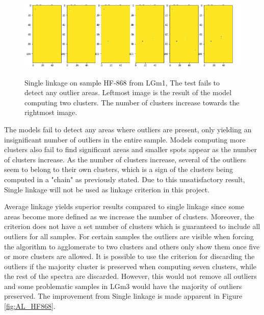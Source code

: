 \begin{figure}[H]

    \centering
{\includegraphics[width=15cm]{images/Single_linkage/LGm-1/HF-868_1_2.h5_0.png} }
\caption{Single linkage on sample HF-868 from LGm1, The test fails to detect any outlier areas. Leftmost image is the result of the model computing two clusters. The number of clusters increase towards the rightmost image.\label{fig:SL_HF868}}%

\end{figure}

The models fail to detect any areas where outliers are present, only yielding an insignificant number of outliers in the entire sample. Models computing more clusters also fail to find significant areas and smaller spots appear as the number of clusters increase. As the number of clusters increase, several of the outliers seem to belong to their own clusters, which is a sign of the clusters being computed in a "chain" as previously stated. Due to this unsatisfactory result, Single linkage will not be used as linkage criterion in this project.


Average linkage yields superior results compared to single linkage since some areas become more defined as we increase the number of clusters. Moreover, the criterion does not have a set number of clusters which is guaranteed to include all outliers for all samples. For certain samples the outliers are visible when forcing the algorithm to agglomerate to two clusters and others only show them once five or more clusters are allowed. It is possible to use the criterion for discarding the outliers if the majority cluster is preserved when computing seven clusters, while the rest of the spectra are discarded. However, this would not remove all outliers and some problematic samples in LGm3 would have the majority of outliers preserved. The improvement from Single linkage is made apparent in Figure \ref{fig:AL_HF868}.


